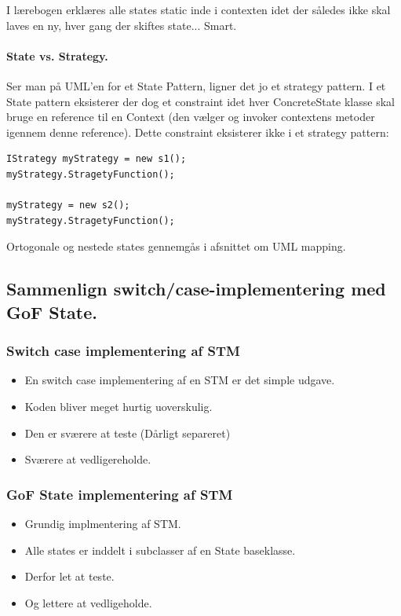 I lærebogen erklæres alle states static inde i contexten idet der således ikke skal laves en ny, hver gang der skiftes state... Smart.

\paragraph{State vs. Strategy.}
Ser man på UML'en for et State Pattern, ligner det jo et strategy pattern. I et State  pattern eksisterer der dog et constraint idet hver ConcreteState klasse skal bruge en reference til en Context (den vælger og invoker contextens metoder igennem denne reference). Dette constraint eksisterer ikke i et strategy pattern:

\begin{lstlisting}[caption=Klients brug af strategy pattern,
morekeywords={abstract, Context}]
IStrategy myStrategy = new s1();
myStrategy.StragetyFunction();

myStrategy = new s2();
myStrategy.StragetyFunction();
\end{lstlisting}

Ortogonale og nestede states gennemgås i afsnittet om UML mapping.

\subsection{Sammenlign switch/case-implementering med GoF State.}

\subsubsection{Switch case implementering af STM}
\begin{itemize}
	\item En switch case implementering af en STM er det simple udgave.
	\item Koden bliver meget hurtig uoverskulig.
	\item Den er sværere at teste (Dårligt separeret)
	\item Sværere at vedligereholde.
\end{itemize}

\subsubsection{GoF State implementering af STM}
\begin{itemize}
	\item Grundig implmentering af STM.
	\item Alle states er inddelt i subclasser af en State baseklasse.
	\item Derfor let at teste.
	\item Og lettere at vedligeholde.
\end{itemize}

